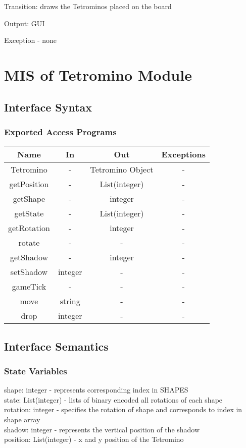 \documentclass[12,english]{article}
\begin{document}
	  Transition: draws the Tetrominos placed on the board
	  
	  Output: GUI
	  
	  Exception - none
\section{MIS of Tetromino Module}
		\subsection{Interface Syntax}
			\subsubsection{Exported Access Programs}
				\begin{tabular}[pos]{|c|c|c|c|}
					
					\hline
					\label{TetrominoEAP}
					\textbf{Name}& \textbf{In} & \textbf{Out} & \textbf{Exceptions} \\ \hline
					Tetromino &  - & Tetromino Object & -\\ \hline
                    getPosition &  - & List(integer) & -\\ \hline
                    getShape &  - & integer & -\\ \hline
                    getState &  - &  List(integer)& -\\ \hline
                    getRotation &  - & integer & -\\ \hline
                    rotate &  - & -  & -\\ \hline
					getShadow &  - & integer & -\\ \hline
				    setShadow &  integer & -  & -\\ \hline
			        gameTick &  - & - & - \\ \hline
			        move & string & - & - \\ \hline
				    drop & integer & - & - \\ \hline
 				\end{tabular}
				
		\subsection{Interface Semantics}
			\subsubsection{State Variables}
			shape: integer - represents corresponding index in SHAPES\\  
			state: List(integer) - lists of binary encoded all rotations of each shape\\
			rotation: integer - specifies the rotation of shape and corresponds to index in shape array\\
			shadow: integer - represents the vertical position of the shadow\\
			position: List(integer) - x and y position of the Tetromino\\
			
\end{document}
